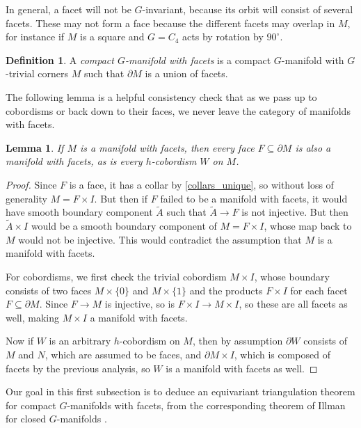 \documentclass[11pt]{amsart}
\newtheorem{lem}{Lemma}[section]
\theoremstyle{definition}
\newtheorem{defn}{Definition}[section]
\numberwithin{equation}{section}
\numberwithin{figure}{section}
\newcommand{\ti}{\widetilde}
\newcommand{\ourdefn}[1]{{\it #1}}
\begin{document}
In general, a facet will not be $G$-invariant, because its orbit will consist of several facets. These may not form a face because the different facets may overlap in $M$, for instance if $M$ is a square and $G = C_4$ acts by rotation by $90^\circ$.

\begin{defn}
	A \ourdefn{compact $G$-manifold with facets} is a compact $G$-manifold with $G$-trivial corners $M$ such that $\partial M$ is a union of facets.
\end{defn}

The following lemma is a helpful consistency check that as we pass up to cobordisms or back down to their faces, we never leave the category of manifolds with facets.

\begin{lem}\label{facets_have_facets}
	If $M$ is a manifold with facets, then every face $F \subseteq \partial M$ is also a manifold with facets, as is every $h$-cobordism $W$ on $M$.
\end{lem}

\begin{proof}
	Since $F$ is a face, it has a collar by \autoref{collars_unique}, so without loss of generality $M = F \times I$. But then if $F$ failed to be a manifold with facets, it would have smooth boundary component $\ti A$ such that $\ti A \to F$ is not injective. But then $\ti A \times I$ would be a smooth boundary component of $M = F \times I$, whose map back to $M$ would not be injective. This would contradict the assumption that $M$ is a manifold with facets.
	
	For cobordisms, we first check the trivial cobordism $M \times I$, whose boundary consists of two faces $M \times \{0\}$ and $M \times \{1\}$ and the products $F \times I$ for each facet $F \subseteq \partial M$. Since $F \to M$ is injective, so is $F \times I \to M \times I$, so these are all facets as well, making $M \times I$ a manifold with facets.
	
	Now if $W$ is an arbitrary $h$-cobordism on $M$, then by assumption $\partial W$ consists of $M$ and $N$, which are assumed to be faces, and $\partial M \times I$, which is composed of facets by the previous analysis, so $W$ is a manifold with facets as well.
\end{proof}

Our goal in this first subsection is to deduce an equivariant triangulation theorem for compact $G$-manifolds with facets, from the corresponding theorem of Illman for closed $G$-manifolds \cite{illman_finite}.
\end{document}

